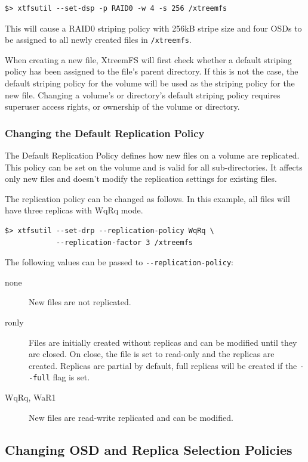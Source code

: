 \documentclass[a4paper,10pt]{book}
\begin{document}
\begin{verbatim}
$> xtfsutil --set-dsp -p RAID0 -w 4 -s 256 /xtreemfs
\end{verbatim}

This will cause a RAID0 striping policy with 256kB stripe size and four OSDs to be assigned to all newly created files in \texttt{/xtreemfs}.

When creating a new file, XtreemFS will first check whether a default striping policy has been assigned to the file's parent directory. If this is not the case, the default striping policy for the volume will be used as the striping policy for the new file. Changing a volume's or directory's default striping policy requires superuser access rights, or ownership of the volume or directory.


\subsubsection{Changing the Default Replication Policy}

The Default Replication Policy defines how new files on a volume are replicated. This policy can be set on the volume and is valid for all sub-directories. It affects only new files and doesn't modify the replication settings for existing files.

The replication policy can be changed as follows. In this example, all files will have three replicas with WqRq mode.
\begin{verbatim}
$> xtfsutil --set-drp --replication-policy WqRq \
            --replication-factor 3 /xtreemfs
\end{verbatim}

The following values can be passed to \verb|--replication-policy|:
\begin{description}
  \item[none] New files are not replicated.
  \item[ronly] Files are initially created without replicas and can be modified until they are closed. On close, the file is set to read-only and the replicas are created. Replicas are partial by default, full replicas will be created if the \verb|--full| flag is set.
  \item[WqRq, WaR1] New files are read-write replicated and can be modified.
\end{description}


\subsection{Changing OSD and Replica Selection Policies}\label{sec:osd_select_policy}
\end{document}
